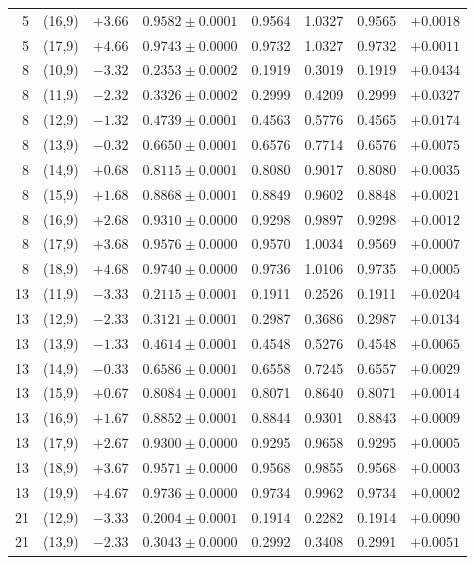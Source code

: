 \documentclass[11pt,a4paper,UTF8]{ctexart}
\begin{document}
{\begin{longtable}{rcrlcccr}
5 & (16,9) & $+3.66$ & $0.9582\pm0.0001$ & 0.9564 & 1.0327 & 0.9565 & $+0.0018$\\
5 & (17,9) & $+4.66$ & $0.9743\pm0.0000$ & 0.9732 & 1.0327 & 0.9732 & $+0.0011$\\
\midrule
8 & (10,9) & $-3.32$ & $0.2353\pm0.0002$ & 0.1919 & 0.3019 & 0.1919 & $+0.0434$\\
8 & (11,9) & $-2.32$ & $0.3326\pm0.0002$ & 0.2999 & 0.4209 & 0.2999 & $+0.0327$\\
8 & (12,9) & $-1.32$ & $0.4739\pm0.0001$ & 0.4563 & 0.5776 & 0.4565 & $+0.0174$\\
8 & (13,9) & $-0.32$ & $0.6650\pm0.0001$ & 0.6576 & 0.7714 & 0.6576 & $+0.0075$\\
8 & (14,9) & $+0.68$ & $0.8115\pm0.0001$ & 0.8080 & 0.9017 & 0.8080 & $+0.0035$\\
8 & (15,9) & $+1.68$ & $0.8868\pm0.0001$ & 0.8849 & 0.9602 & 0.8848 & $+0.0021$\\
8 & (16,9) & $+2.68$ & $0.9310\pm0.0000$ & 0.9298 & 0.9897 & 0.9298 & $+0.0012$\\
8 & (17,9) & $+3.68$ & $0.9576\pm0.0000$ & 0.9570 & 1.0034 & 0.9569 & $+0.0007$\\
8 & (18,9) & $+4.68$ & $0.9740\pm0.0000$ & 0.9736 & 1.0106 & 0.9735 & $+0.0005$\\
\midrule
13 & (11,9) & $-3.33$ & $0.2115\pm0.0001$ & 0.1911 & 0.2526 & 0.1911 & $+0.0204$\\
13 & (12,9) & $-2.33$ & $0.3121\pm0.0001$ & 0.2987 & 0.3686 & 0.2987 & $+0.0134$\\
13 & (13,9) & $-1.33$ & $0.4614\pm0.0001$ & 0.4548 & 0.5276 & 0.4548 & $+0.0065$\\
13 & (14,9) & $-0.33$ & $0.6586\pm0.0001$ & 0.6558 & 0.7245 & 0.6557 & $+0.0029$\\
13 & (15,9) & $+0.67$ & $0.8084\pm0.0001$ & 0.8071 & 0.8640 & 0.8071 & $+0.0014$\\
13 & (16,9) & $+1.67$ & $0.8852\pm0.0001$ & 0.8844 & 0.9301 & 0.8843 & $+0.0009$\\
13 & (17,9) & $+2.67$ & $0.9300\pm0.0000$ & 0.9295 & 0.9658 & 0.9295 & $+0.0005$\\
13 & (18,9) & $+3.67$ & $0.9571\pm0.0000$ & 0.9568 & 0.9855 & 0.9568 & $+0.0003$\\
13 & (19,9) & $+4.67$ & $0.9736\pm0.0000$ & 0.9734 & 0.9962 & 0.9734 & $+0.0002$\\
\midrule
21 & (12,9) & $-3.33$ & $0.2004\pm0.0001$ & 0.1914 & 0.2282 & 0.1914 & $+0.0090$\\
21 & (13,9) & $-2.33$ & $0.3043\pm0.0000$ & 0.2992 & 0.3408 & 0.2991 & $+0.0051$\\

\end{longtable}}
\end{document}
